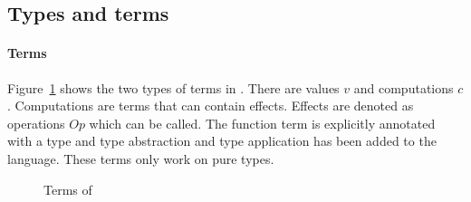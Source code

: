 \subsection{Types and terms}

\paragraph{Terms}
Figure~\ref{fig:terms:core} shows the two types of terms in \core. There are values $v$ and computations $c$. Computations are terms that can contain effects. Effects are denoted as operations $Op$ which can be called. The function term is explicitly annotated with a type and type abstraction and type application has been added to the language. These terms only work on pure types.

\begin{figure}[!htb]
\begin{center}
\end{center}
\caption{Terms of \core}\label{fig:terms:core}
\end{figure}


